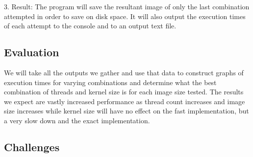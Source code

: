\documentclass{article}
\begin{document}
3. Result:  The program will save the resultant image of only the last combination attempted in order to save on disk space.  It will also output the execution times of each attempt to the console and to an output text file.

\subsection{Evaluation}

We will take all the outputs we gather and use that data to construct graphs of execution times for varying combinations and determine what the best combination of threads and kernel size is for each image size tested.  The results we expect are vastly increased performance as thread count increases and image size increases while kernel size will have no effect on the fast implementation, but a very slow down and the exact implementation.

\subsection{Challenges}
\end{document}
